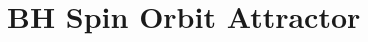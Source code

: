 \documentclass[11pt,
        usenames, %
        dvipsnames %
    ]{article}
\newcommand*{\rd}[2]{\frac{\mathrm{d}#1}{\mathrm{d}#2}}
\newcommand*{\bm}[1]{\boldsymbol{\mathbf{#1}}}
\newcommand*{\uv}[1]{\hat{\bm{#1}}}
\newcommand*{\p}[1]{\left(#1\right)}
\newcommand*{\s}[1]{\left[#1\right]}
\newcommand*{\z}[1]{\left\{#1\right\}}
\begin{document}


\section{BH Spin Orbit Attractor}
\end{document}
